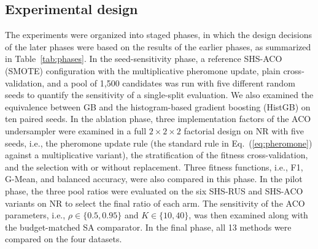 \documentclass[pdflatex,sn-basic]{sn-jnl}
\begin{document}
\subsection{Experimental design}
\label{sec:design}
The experiments were organized into staged phases, in which the design
decisions of the later phases were based on the results of the earlier
phases, as summarized in Table~\ref{tab:phases}. In the seed-sensitivity phase, a reference SHS-ACO (SMOTE) configuration with the multiplicative pheromone update, plain cross-validation, and a pool of 1,500 candidates was run with five different random seeds to quantify the
sensitivity of a single-split evaluation. We also examined the
equivalence between GB and the histogram-based gradient boosting
(HistGB) on ten paired seeds. In the ablation phase, three
implementation factors of the ACO undersampler were examined in a full
$2\times2\times2$ factorial design on NR with five seeds, i.e., the
pheromone update rule (the standard rule in Eq.~(\ref{eq:pheromone})
against a multiplicative variant), the
stratification of the fitness cross-validation, and the selection with
or without replacement. Three fitness functions, i.e., F1, G-Mean, and
balanced accuracy, were also compared in this phase. In the pilot phase,
the three pool ratios were evaluated on the six SHS-RUS and SHS-ACO
variants on NR to select the final ratio of each arm. The sensitivity of
the ACO parameters, i.e., $\rho \in \{0.5, 0.95\}$ and
$K \in \{10, 40\}$, was then examined along with the budget-matched SA
comparator. In the final phase, all 13 methods were compared on the four
datasets.
\end{document}
